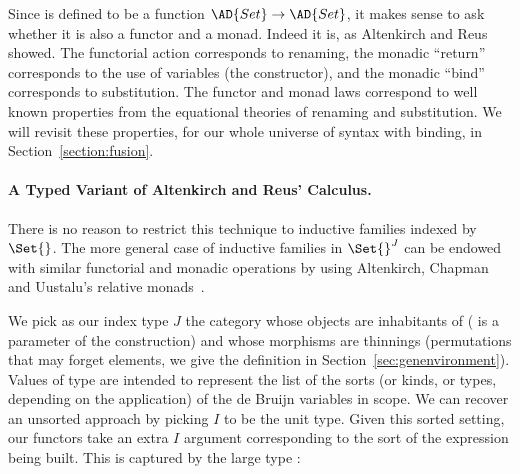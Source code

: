 Since  is defined to be a function $\AD{Set} \to \AD{Set}$, it
makes sense to ask whether it is also a functor and a monad. Indeed it
is, as Altenkirch and Reus showed. The functorial action corresponds
to renaming, the monadic ``return'' corresponds to the use of variables
(the  constructor), and the monadic ``bind'' corresponds
to substitution. The functor and monad laws correspond to well known
properties from the equational theories of renaming and
substitution. We will revisit these properties, for our whole universe
of syntax with binding, in Section~\ref{section:fusion}.

\paragraph{A Typed Variant of Altenkirch and Reus' Calculus.}
\label{section:mech-reus}

There is no reason to restrict this technique to inductive families
indexed by $\Set{}$. The more general case of inductive families in
$\Set{}^J$ can be endowed with similar functorial and monadic
operations by using Altenkirch, Chapman and Uustalu's relative
monads~\citeyear{Altenkirch2010, JFR4389}.

We pick as our index type $J$ the category whose objects are
inhabitants of   ( is a parameter of the
construction) and whose morphisms are thinnings (permutations that may
forget elements, we give the definition in Section~\ref{sec:genenvironment}).  Values of type
  are intended to represent the list of the sorts (or
kinds, or types, depending on the application) of the de Bruijn
variables in scope. We can recover an unsorted approach by picking $I$
to be the unit type.  Given this sorted setting, our functors take an
extra $I$ argument corresponding to the sort of the expression being
built. This is captured by the large type 
:%

